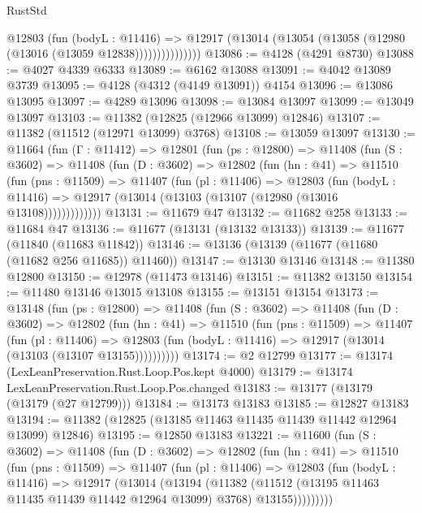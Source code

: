 \begin{lexlean}{RustStd}
\begin{coremodule}
                  @12803
                    (fun (bodyL : @11416) =>
                    @12917 (@13014 (@13054 (@13058 (@12980 (@13016 (@13059 @12838)))))))))))))))
@13086 := @4128 (@4291 @8730)
@13088 := @4027 @4339 @6333
@13089 := @6162 @13088
@13091 := @4042 @13089 @3739
@13095 := @4128 (@4312 (@4149 @13091)) @4154
@13096 := @13086 @13095
@13097 := @4289 @13096
@13098 := @13084 @13097
@13099 := @13049 @13097
@13103 := @11382 (@12825 (@12966 @13099) @12846)
@13107 := @11382 (@11512 (@12971 @13099) @3768)
@13108 := @13059 @13097
@13130 := @11664
    (fun (Γ : @11412) =>
    @12801
      (fun (ps : @12800) =>
      @11408
        (fun (S : @3602) =>
        @11408
          (fun (D : @3602) =>
          @12802
            (fun (hn : @41) =>
            @11510
              (fun (pns : @11509) =>
              @11407
                (fun (pl : @11406) =>
                @12803
                  (fun (bodyL : @11416) =>
                  @12917 (@13014 (@13103 (@13107 (@12980 (@13016 @13108)))))))))))))
@13131 := @11679 @47
@13132 := @11682 @258
@13133 := @11684 @47
@13136 := @11677 (@13131 (@13132 @13133))
@13139 := @11677 (@11840 (@11683 @11842))
@13146 := @13136 (@13139 (@11677 (@11680 (@11682 @256 @11685)) @11460))
@13147 := @13130 @13146
@13148 := @11380 @12800
@13150 := @12978 (@11473 @13146)
@13151 := @11382 @13150
@13154 := @11480 @13146 @13015 @13108
@13155 := @13151 @13154
@13173 := @13148
    (fun (ps : @12800) =>
    @11408
      (fun (S : @3602) =>
      @11408
        (fun (D : @3602) =>
        @12802
          (fun (hn : @41) =>
          @11510
            (fun (pns : @11509) =>
            @11407
              (fun (pl : @11406) =>
              @12803 (fun (bodyL : @11416) => @12917 (@13014 (@13103 (@13107 @13155))))))))))
@13174 := @2 @12799
@13177 := @13174 (LexLeanPreservation.Rust.Loop.Pos.kept @4000)
@13179 := @13174 LexLeanPreservation.Rust.Loop.Pos.changed
@13183 := @13177 (@13179 (@13179 (@27 @12799)))
@13184 := @13173 @13183
@13185 := @12827 @13183
@13194 := @11382 (@12825 (@13185 @11463 @11435 @11439 @11442 @12964 @13099) @12846)
@13195 := @12850 @13183
@13221 := @11600
    (fun (S : @3602) =>
    @11408
      (fun (D : @3602) =>
      @12802
        (fun (hn : @41) =>
        @11510
          (fun (pns : @11509) =>
          @11407
            (fun (pl : @11406) =>
            @12803
              (fun (bodyL : @11416) =>
              @12917
                (@13014
                  (@13194
                    (@11382
                      (@11512 (@13195 @11463 @11435 @11439 @11442 @12964 @13099) @3768)
                      @13155)))))))))

\end{coremodule}
\end{lexlean}
